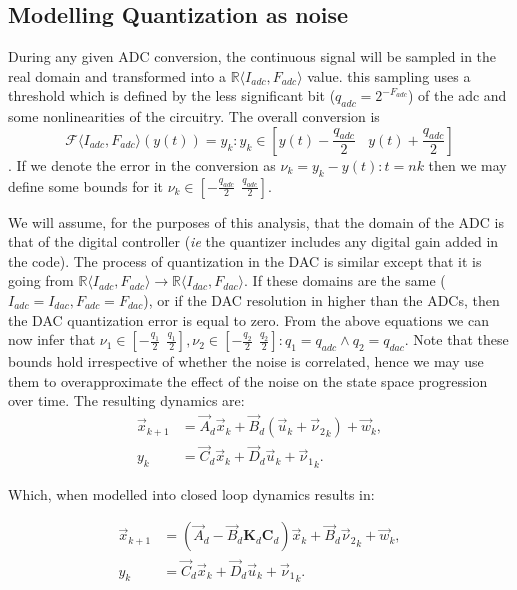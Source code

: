 \documentclass[runningheads,a4paper]{llncs}
\newcommand{\mat}[1]{\boldsymbol{#1}}
\begin{document}
\subsection{Modelling Quantization as noise}

During any given ADC conversion, the continuous signal will be sampled in the real domain and transformed into a $\mathbb{R}\langle I_{adc},F_{adc} \rangle$ value. this sampling uses a threshold which is defined by the less significant bit ($q_{adc}=2^{-F_{adc}}$) of the adc and some nonlinearities of the circuitry. The overall conversion is
$$\mathcal{F}\langle I_{adc},F_{adc} \rangle(y(t)) = y_k : y_k \in \left[y(t)-\frac{q_{adc}}{2}\ \ \ \ y(t)+\frac{q_{adc}}{2}\right]$$.
If we denote the error in the conversion as $\nu_k=y_k-y(t) : t=nk$ then we may define some bounds for it $\nu_k \in [-\frac{q_{adc}}{2}\ \ \frac{q_{adc}}{2}]$.

We will assume, for the purposes of this analysis, that the domain of the ADC is that of the digital controller (\emph{ie} the quantizer includes any digital gain added in the code).
The process of quantization in the DAC is similar except that it is going from $\mathbb{R}\langle I_{adc},F_{adc} \rangle \rightarrow \mathbb{R}\langle I_{dac},F_{dac} \rangle$. If these domains are the same ($I_{adc}=I_{dac},F_{adc}=F_{dac}$), or if the DAC resolution in higher than the ADCs, then the DAC quantization error is equal to zero.
From the above equations we can now infer that $\nu_1 \in [-\frac{q_1}{2}\ \ \frac{q_1}{2}], \nu_2 \in [-\frac{q_2}{2}\ \ \frac{q_2}{2}] : q_1=q_{adc} \wedge q_2=q_{dac}$.
Note that these bounds hold irrespective of whether the noise is correlated, hence we may use them to overapproximate the effect of the noise on the state space progression over time.
The resulting dynamics are:
\begin{align}
\label{eq:pre_quantization}
\vec{x}_{k+1} &= \vec{A}_d\vec{x}_k+\vec{B}_d(\vec{u}_k+{\vec{\nu}_2}_k) + \vec{w}_k,\\
y_k &= \vec{C}_d \vec{x}_ k + \vec{D}_d \vec{u}_ k+{\vec{\nu}_1}_k. 
\end{align}

Which, when modelled into closed loop dynamics results in:

\begin{align}
\label{eq:quantization}
\vec{x}_{k+1} &= (\vec{A}_d-\vec{B}_d\mat{K}_d\mat{C}_d) \vec{x}_k+\vec{B}_d{\vec{\nu}_2}_k + \vec{w}_k,\\
y_k &= \vec{C}_d \vec{x}_ k + \vec{D}_d \vec{u}_ k+{\vec{\nu}_1}_k. 
\end{align}
\end{document}
